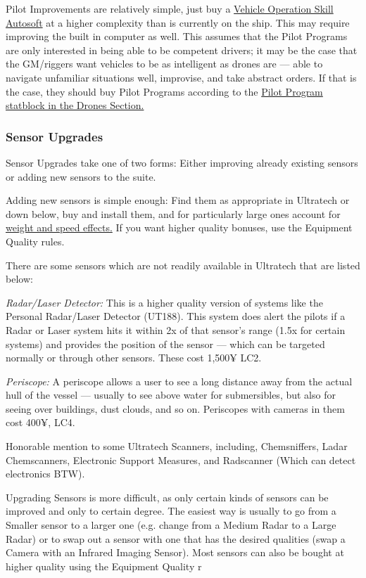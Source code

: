 \begin{multicols*}{2}
	Pilot Improvements are relatively simple, just buy a \hyperref[autosofts]{Vehicle Operation Skill Autosoft} at a higher complexity than is currently on the ship. This may require improving the built in computer as well. This assumes that the Pilot Programs are only interested in being able to be competent drivers; it may be the case that the GM/riggers want vehicles to be as intelligent as drones are — able to navigate unfamiliar situations well, improvise, and take abstract orders. If that is the case, they should buy Pilot Programs according to the \hyperref[drones]{Pilot Program statblock in the Drones Section.}
	
	\subsubsection{Sensor Upgrades}
	
	Sensor Upgrades take one of two forms: Either improving already existing sensors or adding new sensors to the suite.
	
	Adding new sensors is simple enough: Find them as appropriate in Ultratech or down below, buy and install them, and for particularly large ones account for \hyperref[weight_and_speed]{weight and speed effects.} If you want higher quality bonuses, use the Equipment Quality rules.
	
	There are some sensors which are not readily available in Ultratech that are listed below:
	
	\textit{Radar/Laser Detector:} This is a higher quality version of systems like the Personal Radar/Laser Detector (UT188). This system does alert the pilots if a Radar or Laser system hits it within 2x of that sensor's range (1.5x for certain systems) and provides the position of the sensor — which can be targeted normally or through other sensors. These cost 1,500¥ LC2.
	
	\textit{Periscope:} A periscope allows a user to see a long distance away from the actual hull of the vessel — usually to see above water for submersibles, but also for seeing over buildings, dust clouds, and so on. Periscopes with cameras in them cost 400¥, LC4.
	
	Honorable mention to some Ultratech Scanners, including, Chemsniffers, Ladar Chemscanners, Electronic Support Measures, and Radscanner (Which can detect electronics BTW).
	
	Upgrading Sensors is more difficult, as only certain kinds of sensors can be improved and only to certain degree. The easiest way is usually to go from a Smaller sensor to a larger one (e.g. change from a Medium Radar to a Large Radar) or to swap out a sensor with one that has the desired qualities (swap a Camera with an Infrared Imaging Sensor). Most sensors can also be bought at higher quality using the Equipment Quality r
	

\end{multicols*}
